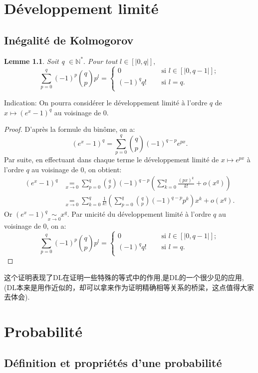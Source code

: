 \documentclass[12pt]{book}
\theoremstyle{definition}\newtheorem{dfn}{Définition}[chapter]
\theoremstyle{plain}\newtheorem{thm}{Théorème}[chapter]
\theoremstyle{plain}\newtheorem{prp}{Proposition}[chapter]
\theoremstyle{plain}\newtheorem{lem}{\bf Lemme}[chapter]
\theoremstyle{plain}\newtheorem{axm}{\bf Axiome}[chapter]
\theoremstyle{plain}\newtheorem{lmm}{\bf Lemme}[chapter]
\theoremstyle{plain}\newtheorem{exm}{\bf Example}[chapter]
\theoremstyle{plain}\newtheorem{cor}{\bf Corollaire}[chapter]
\theoremstyle{remark}\newtheorem{rem}{Remarque}[chapter]
\begin{document}
\chapter{Développement limité }
\section{Inégalité de Kolmogorov}
\begin{lem}
 Soit q $\in \mathbb N^*.$ Pour tout $l\in [|0,q|],$
$$\sum_{p=0}^q(-1)^p\binom{q}{p}p^l=\left\{
\begin{aligned}
0&\quad\text{ si }l\in [|0,q-1|];\\
(-1)^qq!&\quad\text{ si }l=q.\\
\end{aligned}\right.$$
\end{lem}

Indication: On pourra considérer le développement limité à l'ordre $q$ de $x\longmapsto (e^x-1)^q$ au voisinage de 0.
\begin{proof}
 D'après la formule du binôme, on a: 
$$(e^x-1)^q=\sum^q_{p=0}\binom{q}{p}(-1)^{q-p}e^{px}.$$
Par suite, en effectuant dans chaque terme le développement limité de $x\longmapsto e^{px}$ à l'ordre $q$ au voisinage de 0, on obtient:
$$\begin{aligned}
(e^x-1)^q&\underset{x\to 0}=\sum^q_{p=0}\binom{q}{p}(-1)^{q-p}\left(\sum^q_{k=0}\frac{(px)^k}{k!}+o(x^q)\right)\\
&\underset{x\to 0}=\sum^q_{k=0}\frac{1}{k!}\left(\sum^q_{p=0}\binom{q}{p}(-1)^{q-p}p^k\right)x^k+o(x^q).
\end{aligned}$$
Or $(e^x-1)^q\underset{x\to 0}\sim x^q$. Par  unicité du développement limité à l'ordre $q$ au voisinage de 0, on a: $$\sum_{p=0}^q(-1)^p\binom{q}{p}p^l=\left\{
\begin{aligned}
0&\quad\text{ si }l\in [|0,q-1|];\\
(-1)^qq!&\quad\text{ si }l=q.\\
\end{aligned}\right.$$ 
\end{proof}

这个证明表现了DL在证明一些特殊的等式中的作用,是DL的一个很少见的应用,(DL本来是用作近似的，却可以拿来作为证明精确相等关系的桥梁，这点值得大家去体会).


\chapter{Probabilité}
\section{Définition et propriétés d'une probabilité }%
\end{document}
